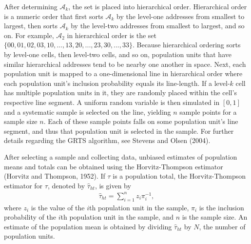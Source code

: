 \documentclass[]{elsarticle} %
\begin{document}
After determining \(\mathcal{A}_k\), the set is placed into hierarchical
order. Hierarchical order is a numeric order that first sorts
\(\mathcal{A}_k\) by the level-one addresses from smallest to largest,
then sorts \(\mathcal{A}_k\) by the level-two addresses from smallest to
largest, and so on. For example, \(\mathcal{A}_2\) in hierarchical order
is the set
\linebreak \(\{00, 01, 02, 03, 10, ..., 13, 20, ..., 23, 30, ..., 33\}\).
Because hierarchical ordering sorts by level-one cells, then level-two
cells, and so on, population units that have similar hierarchical
addresses tend to be nearby one another in space. Next, each population
unit is mapped to a one-dimensional line in hierarchical order where
each population unit's inclusion probability equals its line-length. If
a level-\(k\) cell has multiple population units in it, they are
randomly placed within the cell's respective line segment. A uniform
random variable is then simulated in \([0, 1]\) and a systematic sample
is selected on the line, yielding \(n\) sample points for a sample size
\(n\). Each of these sample points falls on some population unit's line
segment, and thus that population unit is selected in the sample. For
further details regarding the GRTS algorithm, see Stevens and Olsen
(2004).

After selecting a sample and collecting data, unbiased estimates of
population means and totals can be obtained using the Horvitz-Thompson
estimator (Horvitz and Thompson, 1952). If \(\tau\) is a population
total, the Horvitz-Thompson estimator for \(\tau\), denoted by
\(\hat{\tau}_{ht}\), is given by \begin{align}\label{eq:ht}
  \hat{\tau}_{ht} = \sum_{i = 1}^n z_i \pi_i^{-1},
\end{align} where \(z_i\) is the value of the \(i\)th population unit in
the sample, \(\pi_i\) is the inclusion probability of the \(i\)th
population unit in the sample, and \(n\) is the sample size. An estimate
of the population mean is obtained by dividing \(\hat{\tau}_{ht}\) by
\(N\), the number of population units.
\end{document}
